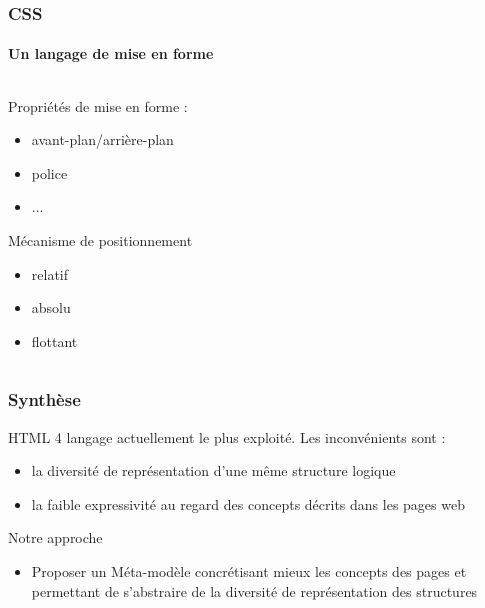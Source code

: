 \documentclass[]{beamer}
\begin{document}
\begin{frame}
\frametitle{CSS}
\framesubtitle{Un langage de mise en forme}
\begin{columns}
	\begin{column}{5cm}
	\begin{block}{Propriétés de mise en forme :}		
		\begin{itemize}
			\item avant-plan/arrière-plan
			\item police
			\item ...
		\end{itemize}
	\end{block}
	\begin{block}{Mécanisme de positionnement}
		\begin{itemize}
			\item relatif
			\item absolu
			\item flottant
		\end{itemize}
	\end{block}
	\end{column}
	\begin{column}{5cm}
	\end{column}
\end{columns}\end{frame}

\begin{frame}
\frametitle{Synthèse}
\begin{block}{}
HTML 4 langage actuellement le plus exploité. Les inconvénients sont :
\begin{itemize}
	\item la diversité de représentation d'une même structure logique
	\item la faible expressivité au regard des concepts décrits dans les pages web
\end{itemize}
\end{block}
\begin{block}{Notre approche}
\begin{itemize}
	\item Proposer un Méta-modèle concrétisant mieux les concepts des pages et permettant de s'abstraire de la diversité de représentation des structures 
\end{itemize}
\end{block}
\end{frame}
\end{document}
